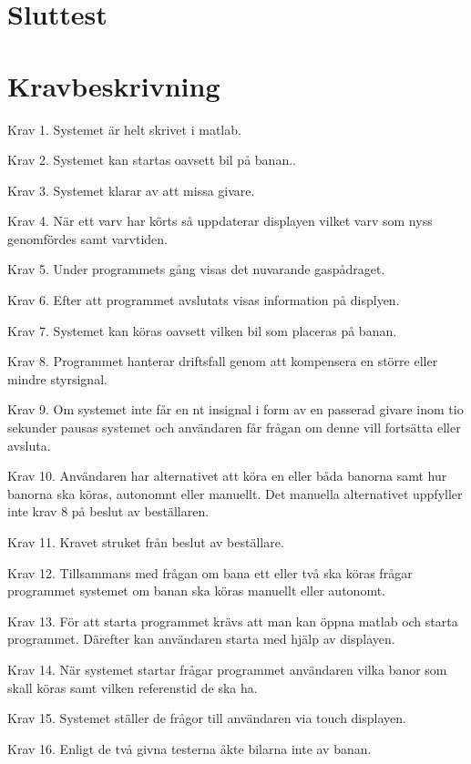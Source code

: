 \documentclass[10pt,oneside,swedish]{lips-no_customer}
\begin{document}
\section{Sluttest}

\section{Kravbeskrivning}

Krav 1. Systemet är helt skrivet i matlab.

Krav 2. Systemet kan startas oavsett bil på banan.. 

Krav 3. Systemet klarar av att missa givare. 

Krav 4. När ett varv har körts så uppdaterar displayen vilket varv som nyss
genomfördes samt varvtiden. 

Krav 5. Under programmets gång visas det nuvarande gaspådraget. 

Krav 6. Efter att programmet avslutats visas information på displyen.

Krav 7. Systemet kan köras oavsett vilken bil som placeras på banan. 

Krav 8. Programmet hanterar driftsfall genom att kompensera en större eller
mindre styrsignal. 

Krav 9. Om systemet inte får en nt insignal i form av en passerad givare inom
tio sekunder pausas systemet och användaren får frågan om denne vill fortsätta
eller avsluta. 

Krav 10. Användaren har alternativet att köra en eller båda banorna samt hur
banorna ska köras, autonomnt eller manuellt. Det manuella alternativet uppfyller
inte krav 8 på beslut av beställaren. 

Krav 11. Kravet struket från beslut av beställare. 

Krav 12. Tillsammans med frågan om bana ett eller två ska köras frågar
programmet systemet om banan ska köras manuellt eller autonomt. 

Krav 13. För att starta programmet krävs att man kan öppna matlab och starta
programmet. Därefter kan användaren starta med hjälp av displayen.  
 
Krav 14. När systemet startar frågar programmet användaren vilka banor som skall
köras samt vilken referenstid de ska ha. 

Krav 15. Systemet ställer de frågor till användaren via touch displayen.

Krav 16. Enligt de två givna testerna åkte bilarna inte av banan.
\end{document}
